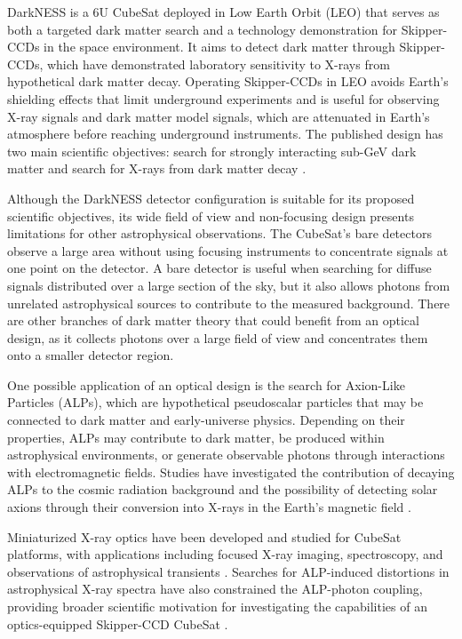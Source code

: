 \documentclass[10pt,letterpaper,twocolumn]{article}
\begin{document}
DarkNESS is a 6U CubeSat deployed in Low Earth Orbit (LEO) that serves as both a targeted dark matter search and a technology demonstration for Skipper-CCDs in the space environment. It aims to detect dark matter through Skipper-CCDs, which have demonstrated laboratory sensitivity to X-rays from hypothetical dark matter decay. Operating Skipper-CCDs in LEO avoids Earth's shielding effects that limit underground experiments and is useful for observing X-ray signals and dark matter model signals, which are attenuated in Earth's atmosphere before reaching underground instruments. The published design has two main scientific objectives: search for strongly interacting sub-GeV dark matter and search for X-rays from dark matter decay \cite{alpine2025darkness}.


Although the DarkNESS detector configuration is suitable for its proposed scientific objectives, its wide field of view and non-focusing design presents limitations for other astrophysical observations. The CubeSat's bare detectors observe a large area without using focusing instruments to concentrate signals at one point on the detector. A bare detector is useful when searching for diffuse signals distributed over a large section of the sky, but it also allows photons from unrelated astrophysical sources to contribute to the measured background. There are other branches of dark matter theory that could benefit from an optical design, as it collects photons over a large field of view and concentrates them onto a smaller detector region. 

One possible application of an optical design is the search for Axion-Like Particles (ALPs), which are hypothetical pseudoscalar particles that may be connected to dark matter and early-universe physics. Depending on their properties, ALPs may contribute to dark matter, be produced within astrophysical environments, or generate observable photons through interactions with electromagnetic fields. Studies have investigated the contribution of decaying ALPs to the cosmic radiation background and the possibility of detecting solar axions through their conversion into X-rays in the Earth's magnetic field \cite{porrasbedmar2024decaying,davoudiasl2008gecosax}.

Miniaturized X-ray optics have been developed and studied for CubeSat platforms, with applications including focused X-ray imaging, spectroscopy, and observations of astrophysical transients \cite{baca2016vzlusat,stupl2018cubex,daniel2022xray}. Searches for ALP-induced distortions in astrophysical X-ray spectra have also constrained the ALP-photon coupling, providing broader scientific motivation for investigating the capabilities of an optics-equipped Skipper-CCD CubeSat \cite{reynolds2020alp}.
\end{document}
